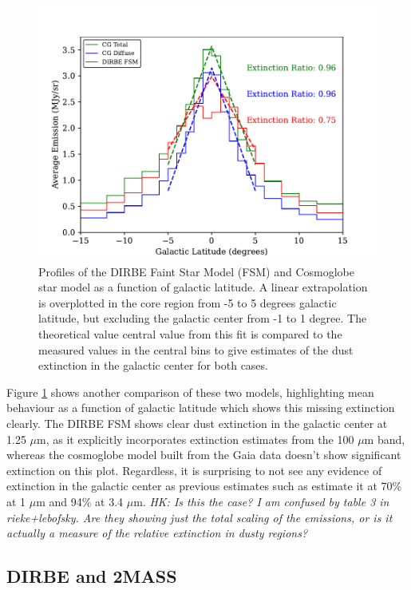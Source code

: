 \documentclass{aa}
\begin{document}
\begin{figure}
\includegraphics[width=\columnwidth]{figs/diffuseTemplate/extinction.pdf}
  \caption{Profiles of the DIRBE Faint Star Model (FSM) and Cosmoglobe star model as a function of galactic latitude. A linear extrapolation is overplotted in the core region from -5 to 5 degrees galactic latitude, but excluding the galactic center from -1 to 1 degree. The theoretical value central value from this fit is compared to the measured values in the central bins to give estimates of the dust extinction in the galactic center for both cases.}
  \label{fig:extinction}
\end{figure}

Figure \ref{fig:extinction} shows another comparison of these two models, highlighting mean behaviour as a function of galactic latitude which shows this missing extinction clearly. The DIRBE FSM shows clear dust extinction in the galactic center at 1.25 $\mu$m, as it explicitly incorporates extinction estimates from the 100 $\mu$m band, whereas the cosmoglobe model built from the Gaia data doesn't show significant extinction on this plot. Regardless, it is surprising to not see any evidence of extinction in the galactic center as previous estimates such as \cite{extinction} estimate it at 70\% at 1 $\mu$m and 94\% at 3.4 $\mu$m. \emph{HK: Is this the case? I am confused by table 3 in rieke+lebofsky. Are they showing just the total scaling of the emissions, or is it actually a measure of the relative extinction in dusty regions?}

\subsection{DIRBE and 2MASS}
\end{document}
